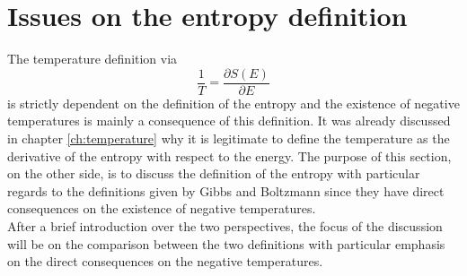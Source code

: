\chapter{Issues on the entropy definition}
\label{ch:entropy}
The temperature definition via
\begin{equation*}
    \frac{1}{T} = \frac{\partial S(E)}{\partial E}
\end{equation*}
is strictly dependent on the definition of the entropy and the existence of negative temperatures is mainly a consequence of this definition. 
It was already discussed in chapter \ref{ch:temperature} why it is legitimate to define the temperature as the derivative of the entropy with respect to the energy. The purpose of this section, on the other side,
is to discuss the definition of the entropy with particular regards to the definitions given by Gibbs and Boltzmann since they have direct consequences on the existence of negative temperatures. \\
After a brief introduction over the two perspectives, the focus of the discussion will be on the comparison between the two definitions with particular emphasis on the direct consequences on the negative temperatures.

